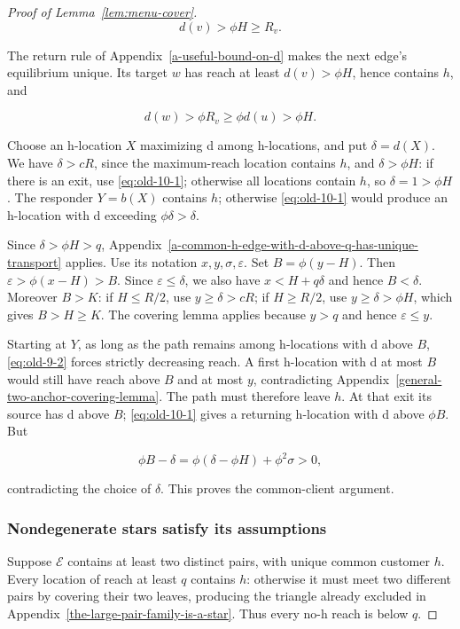 \documentclass[11pt]{amsart}
\numberwithin{equation}{section}
\theoremstyle{definition}
\begin{document}
\begin{proof}[Proof of Lemma~\ref{lem:menu-cover}]
\[
d(v)>\phi H\ge R_v.
\]

The return rule of Appendix~\ref{a-useful-bound-on-d} makes the next edge's equilibrium unique. Its target \(w\) has reach at least \(d(v)>\phi H\), hence contains \(h\), and

\begin{equation}
d(w)>\phi R_v\ge\phi d(u)>\phi H. \label{eq:old-10-1}
\end{equation}

Choose an h-location \(X\) maximizing d among h-locations, and put \(\delta=d(X)\). We have \(\delta>cR\), since the maximum-reach location contains \(h\), and \(\delta>\phi H\): if there is an exit, use \eqref{eq:old-10-1}; otherwise all locations contain \(h\), so \(\delta=1>\phi H\). The responder \(Y=b(X)\) contains \(h\); otherwise \eqref{eq:old-10-1} would produce an h-location with d exceeding \(\phi\delta>\delta\).

Since \(\delta>\phi H>q\), Appendix~\ref{a-common-h-edge-with-d-above-q-has-unique-transport} applies. Use its notation \(x,y,\sigma,\varepsilon\). Set \(B=\phi(y-H)\). Then \(\varepsilon>\phi(x-H)>B\). Since \(\varepsilon\le\delta\), we also have \(x<H+q\delta\) and hence \(B<\delta\). Moreover \(B>K\): if \(H\le R/2\), use \(y\ge\delta>cR\); if \(H\ge R/2\), use \(y\ge\delta>\phi H\), which gives \(B>H\ge K\). The covering lemma applies because \(y>q\) and hence \(\varepsilon\le y\).

Starting at \(Y\), as long as the path remains among h-locations with d above \(B\), \eqref{eq:old-9-2} forces strictly decreasing reach. A first h-location with d at most \(B\) would still have reach above \(B\) and at most \(y\), contradicting Appendix~\ref{general-two-anchor-covering-lemma}. The path must therefore leave \(h\). At that exit its source has d above \(B\); \eqref{eq:old-10-1} gives a returning h-location with d above \(\phi B\). But

\[
\phi B-\delta
=\phi(\delta-\phi H)+\phi^2\sigma>0,
\]

contradicting the choice of \(\delta\). This proves the common-client argument.


\subsubsection{Nondegenerate stars satisfy its assumptions}\label{nondegenerate-stars-satisfy-its-assumptions}

Suppose \(\mathcal E\) contains at least two distinct pairs, with unique common customer \(h\). Every location of reach at least \(q\) contains \(h\): otherwise it must meet two different pairs by covering their two leaves, producing the triangle already excluded in Appendix~\ref{the-large-pair-family-is-a-star}. Thus every no-h reach is below \(q\).


\end{proof}
\end{document}
